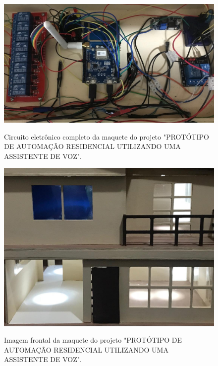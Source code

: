 \begin{figure}[htbp]
	\centering
	\caption{Circuito eletrônico completo da maquete do projeto "PROTÓTIPO DE AUTOMAÇÃO RESIDENCIAL UTILIZANDO UMA ASSISTENTE DE VOZ".}
	\includegraphics[scale=0.4]{Imagens/circuito_eletronico_leandro_dallarosa.png}
	\label{fig:circuito_eletronico_leandro_dallarosa}
\end{figure}

\begin{figure}[htbp]
	\centering
	\caption{Imagem frontal da maquete do projeto "PROTÓTIPO DE AUTOMAÇÃO RESIDENCIAL UTILIZANDO UMA ASSISTENTE DE VOZ".}
	\includegraphics[scale=0.4]{Imagens/maquete_leandro_dallarosa.png}
	\label{fig:maquete_leandro_dallarosa}
\end{figure}

